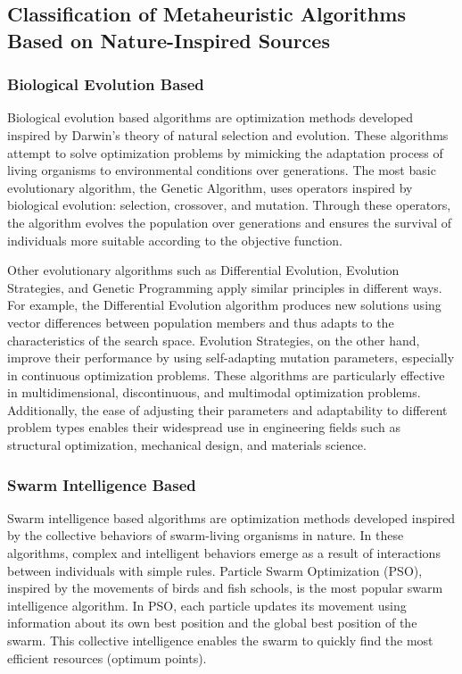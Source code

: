 \subsection{Classification of Metaheuristic Algorithms Based on Nature-Inspired Sources}

\subsubsection{Biological Evolution Based}

Biological evolution based algorithms are optimization methods developed inspired by Darwin's theory of natural selection and evolution. These algorithms attempt to solve optimization problems by mimicking the adaptation process of living organisms to environmental conditions over generations. The most basic evolutionary algorithm, the Genetic Algorithm, uses operators inspired by biological evolution: selection, crossover, and mutation. Through these operators, the algorithm evolves the population over generations and ensures the survival of individuals more suitable according to the objective function.

Other evolutionary algorithms such as Differential Evolution, Evolution Strategies, and Genetic Programming apply similar principles in different ways. For example, the Differential Evolution algorithm produces new solutions using vector differences between population members and thus adapts to the characteristics of the search space. Evolution Strategies, on the other hand, improve their performance by using self-adapting mutation parameters, especially in continuous optimization problems. These algorithms are particularly effective in multidimensional, discontinuous, and multimodal optimization problems. Additionally, the ease of adjusting their parameters and adaptability to different problem types enables their widespread use in engineering fields such as structural optimization, mechanical design, and materials science.

\subsubsection{Swarm Intelligence Based}

Swarm intelligence based algorithms are optimization methods developed inspired by the collective behaviors of swarm-living organisms in nature. In these algorithms, complex and intelligent behaviors emerge as a result of interactions between individuals with simple rules. Particle Swarm Optimization (PSO), inspired by the movements of birds and fish schools, is the most popular swarm intelligence algorithm. In PSO, each particle updates its movement using information about its own best position and the global best position of the swarm. This collective intelligence enables the swarm to quickly find the most efficient resources (optimum points).

